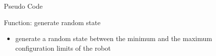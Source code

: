 \documentclass[%
  professionalfonts,%
  xcolor={%
    usenames,%
    dvipsnames,%
    svgnames,%
    table,%
    hyperref%
  }%
]{beamer}
\begin{document}
      \begin{frame}{Pseudo Code}
        
      \end{frame}
      
      
      \begin{frame}{Function: generate random state}
        \begin{itemize}
          \item generate a random state between the minimum and the maximum configuration limits of the robot
        \end{itemize}
        
      \end{frame}
      
\end{document}
